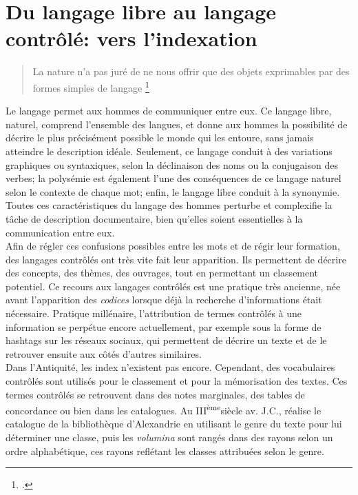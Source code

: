 \section{\label{I-A-1}Du langage libre au langage contrôlé: vers l'indexation}

\begin{quote}
	\og La nature n'a pas juré de ne nous offrir que des objets exprimables par des formes simples de langage \footcite[p.18]{valery_variete_1936} \fg{}
\end{quote}

Le langage permet aux hommes de communiquer entre eux. Ce langage libre, naturel, comprend l'ensemble des langues, et donne aux hommes la possibilité de décrire le plus précisément possible le monde qui les entoure, sans jamais atteindre le description idéale. Seulement, ce langage conduit à des variations graphiques ou syntaxiques, selon la déclinaison des noms ou la conjugaison des verbes; la polysémie est également l'une des conséquences de ce langage naturel selon le contexte de chaque mot; enfin, le langage libre conduit à la synonymie. Toutes ces caractéristiques du langage des hommes perturbe et complexifie la tâche de description documentaire, bien qu'elles soient essentielles à la communication entre eux.\\

Afin de régler ces confusions possibles entre les mots et de régir leur formation, des langages contrôlés ont très vite fait leur apparition. Ils permettent de décrire des concepts, des thèmes, des ouvrages, tout en permettant un classement potentiel. Ce recours aux langages contrôlés est une pratique très ancienne, née avant l'apparition des \textit{codices} lorsque déjà la recherche d'informations était nécessaire. Pratique millénaire, l'attribution de termes contrôlés à une information se perpétue encore actuellement, par exemple sous la forme de \og hashtags\fg{} sur les réseaux sociaux, qui permettent de décrire un texte et de le retrouver ensuite aux côtés d'autres similaires.\\

Dans l'Antiquité, les index n'existent pas encore. Cependant, des vocabulaires contrôlés sont utilisés pour le classement et pour la mémorisation des textes. Ces termes contrôlés se retrouvent dans des notes marginales, des tables de concordance ou bien dans les catalogues. Au \textsc{III}\textsuperscript{ème}siècle av. J.C.,  réalise le catalogue de la bibliothèque d'Alexandrie en utilisant le genre du texte pour lui déterminer une classe, puis les \textit{volumina} sont rangés dans des rayons selon un ordre alphabétique, ces rayons reflétant les classes attribuées selon le genre.\\

